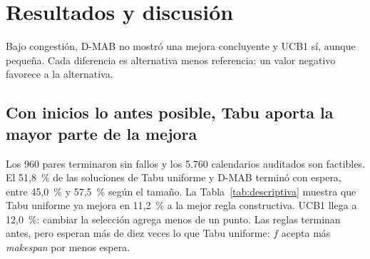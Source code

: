 %   
\section{Resultados y discusión}
\label{sec:resultados}\label{res-ini}
\makeatletter{}\makeatother
{}

Bajo congestión, D-MAB no mostró una mejora concluyente y UCB1 sí, aunque pequeña.
Cada diferencia es alternativa menos referencia: un valor negativo favorece
a la alternativa.

\subsection{Con inicios lo antes posible, Tabu aporta la mayor parte de la mejora}
\label{subsec:absolutos}
Los 960 pares terminaron sin fallos y los 5.760 calendarios auditados son
factibles.
El 51,8~\% de las soluciones de Tabu uniforme y D-MAB terminó con espera, entre
45,0~\% y 57,5~\% según el tamaño.
La Tabla~\ref{tab:descriptiva} muestra que Tabu uniforme ya mejora en 11,2~\% a la
mejor regla constructiva. UCB1 llega a 12,0~\%: cambiar la selección agrega menos de un
punto.
Las reglas terminan antes, pero esperan más de diez veces lo que Tabu uniforme: $f$
acepta más \emph{makespan} por menos espera.

\begin{table}[!ht]
 \centering
 \caption{Resultados en congestión (48 instancias, semillas 90--109; menor es mejor). RPD: respecto del mejor valor conocido, no del óptimo. Negrita: menor valor de cada bloque.}
 \label{tab:descriptiva}
 \scriptsize\setlength{\tabcolsep}{4pt}
 
\end{table}

